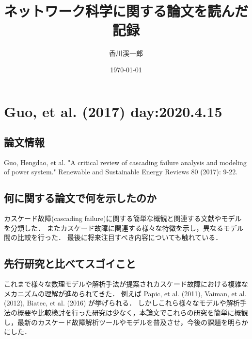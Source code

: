 \documentclass[a4paper,11pt]{jsarticle}
\begin{document}
\title{ネットワーク科学に関する論文を読んだ記録}
\author{香川渓一郎}
\date{\today}
\maketitle

\setcounter{tocdepth}{1}
\tableofcontents

\newpage

\section{Guo, et al. (2017) day:2020.4.15}
    \subsection{論文情報}
    Guo, Hengdao, et al. "A critical review of cascading failure analysis and modeling of power system." Renewable and Sustainable Energy Reviews 80 (2017): 9-22.
    \subsection{何に関する論文で何を示したのか}
    カスケード故障(cascading failure)に関する簡単な概観と関連する文献やモデルを分類した．
    またカスケード故障に関連する様々な特徴を示し，異なるモデル間の比較を行った．
    最後に将来注目すべき内容についても触れている．
    \subsection{先行研究と比べてスゴイこと}
    これまで様々な数理モデルや解析手法が提案されカスケード故障における複雑なメカニズムの理解が進められてきた．
    例えば Papic, et al. (2011), Vaiman, et al. (2012), Biatec, et al. (2016) が挙げられる．
    しかしこれら様々なモデルや解析手法の概要や比較検討を行った研究は少なく，本論文でこれらの研究を簡単に概観し，最新のカスケード故障解析ツールやモデルを普及させ，今後の課題を明らかにした．
\end{document}
